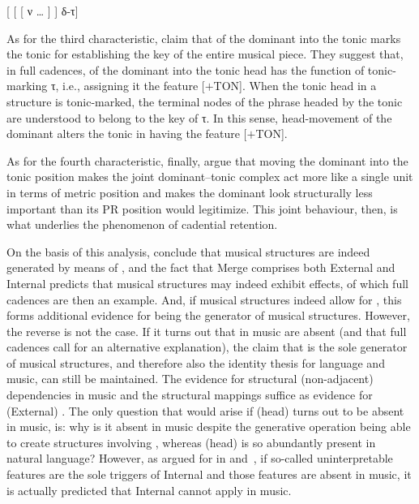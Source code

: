 \documentclass[output=paper]{langsci/langscibook}
\begin{document}
\ea\label{bkm:Ref348711137}
    {}[ [ [ ν \dots{} ]  ] δ-τ]
\z

As for the third characteristic, \citeauthor{KatzPes2011} claim that 
of the dominant into the tonic marks the tonic for establishing the key of the
entire musical piece. They suggest that, in full cadences,  of the
dominant into the tonic head has the function of tonic-marking τ, i.e.,
assigning it the feature [$+$TON]. When the tonic head in a structure is
tonic-marked, the terminal nodes of the phrase headed by the tonic are
understood to belong to the key of τ. In this sense, head-movement of the
dominant alters the tonic in having the feature [$+$TON].

As for the fourth characteristic, finally, \citeauthor{KatzPes2011} argue that
moving the dominant into the tonic position makes the joint dominant–tonic
complex act more like a single unit in terms of metric position and makes the
dominant look structurally less important than its \gls{PR} position would
legitimize. This joint behaviour, then, is what underlies the phenomenon of
cadential retention.

On the basis of this analysis, \citeauthor{KatzPes2011} conclude that musical
structures are indeed generated by means of , and the fact that
Merge comprises both External and Internal  predicts that musical
structures may indeed exhibit  effects, of which full cadences are then
an example.  And, if musical structures indeed allow for , this forms
additional evidence for  being the generator of musical structures.
However, the reverse is not the case. If it turns out that  in
music are absent (and that full cadences call for an alternative explanation),
the claim that  is the sole generator of musical structures, and therefore
also the identity thesis for language and music, can still be maintained. The
evidence for structural (non-adjacent) dependencies in music and the structural
mappings suffice as evidence for (External) . The only question that
would arise if (head)  turns out to be absent in music, is: why
is it absent in music despite the generative operation  being able
to create structures involving , whereas (head)  is
so abundantly present in natural language? However, as argued for in
 and~, if so-called uninterpretable features are the
sole triggers of Internal  and those features are absent in music,
it is actually predicted that Internal  cannot apply in music.
\end{document}
